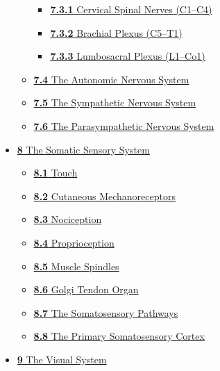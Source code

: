 \begin{itemize}
\begin{itemize}
    \begin{itemize}
    \tightlist
    \item
      \href{the-peripheral-nervous-system.html\#cervical-spinal-nerves-c1c4}{\emph{}\textbf{7.3.1}
      Cervical Spinal Nerves (C1--C4)}
    \item
      \href{the-peripheral-nervous-system.html\#brachial-plexus-c5t1}{\emph{}\textbf{7.3.2}
      Brachial Plexus (C5--T1)}
    \item
      \href{the-peripheral-nervous-system.html\#lumbosacral-plexus-l1co1}{\emph{}\textbf{7.3.3}
      Lumbosacral Plexus (L1--Co1)}
    \end{itemize}
  \item
    \href{the-peripheral-nervous-system.html\#the-autonomic-nervous-system}{\emph{}\textbf{7.4}
    The Autonomic Nervous System}
  \item
    \href{the-peripheral-nervous-system.html\#the-sympathetic-nervous-system}{\emph{}\textbf{7.5}
    The Sympathetic Nervous System}
  \item
    \href{the-peripheral-nervous-system.html\#the-parasympathetic-nervous-system}{\emph{}\textbf{7.6}
    The Parasympathetic Nervous System}
  \end{itemize}
\item
  \href{the-somatic-sensory-system.html}{\emph{}\textbf{8} The Somatic
  Sensory System}

  \begin{itemize}
  \tightlist
  \item
    \href{the-somatic-sensory-system.html\#touch}{\emph{}\textbf{8.1}
    Touch}
  \item
    \href{the-somatic-sensory-system.html\#cutaneous-mechanoreceptors}{\emph{}\textbf{8.2}
    Cutaneous Mechanoreceptors}
  \item
    \href{the-somatic-sensory-system.html\#nociception}{\emph{}\textbf{8.3}
    Nociception}
  \item
    \href{the-somatic-sensory-system.html\#proprioception}{\emph{}\textbf{8.4}
    Proprioception}
  \item
    \href{the-somatic-sensory-system.html\#muscle-spindles}{\emph{}\textbf{8.5}
    Muscle Spindles}
  \item
    \href{the-somatic-sensory-system.html\#golgi-tendon-organ}{\emph{}\textbf{8.6}
    Golgi Tendon Organ}
  \item
    \href{the-somatic-sensory-system.html\#the-somatosensory-pathways}{\emph{}\textbf{8.7}
    The Somatosensory Pathways}
  \item
    \href{the-somatic-sensory-system.html\#the-primary-somatosensory-cortex}{\emph{}\textbf{8.8}
    The Primary Somatosensory Cortex}
  \end{itemize}
\item
  \href{the-visual-system.html}{\emph{}\textbf{9} The Visual System}


\end{itemize}
